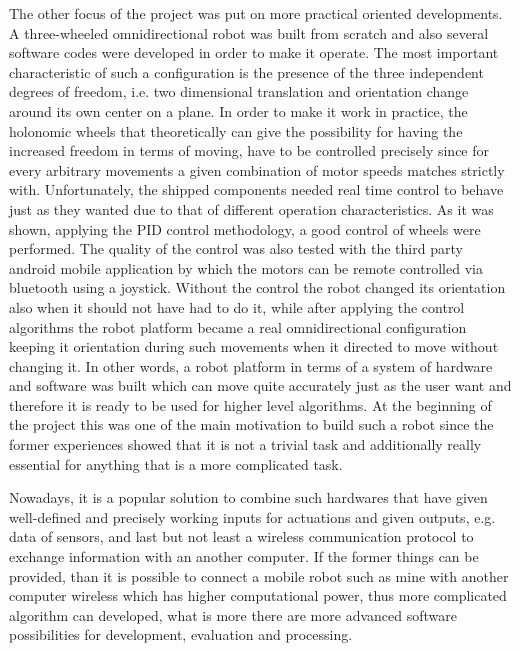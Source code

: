 \documentclass[12pt,english,twoside]{article}
\begin{document}
The other focus of the project was put on more practical oriented developments. A three-wheeled omnidirectional robot was built from scratch and also several software codes were developed in order to make it operate. The most important characteristic of such a configuration is the presence of the three independent degrees of freedom, i.e. two dimensional translation and orientation change around its own center on a plane. In order to make it work in practice, the holonomic wheels that theoretically can give the possibility for having the increased freedom in terms of moving, have to be controlled precisely since for every arbitrary movements a given combination of motor speeds matches strictly with. Unfortunately, the shipped components needed real time control to behave just as they wanted due to that of different operation characteristics. As it was shown, applying the PID control methodology, a good control of wheels were performed. The quality of the control was also tested with the third party android mobile application by which the motors can be remote controlled via bluetooth using a joystick. Without the control the robot changed its orientation also when it should not have had to do it, while after applying the control algorithms the robot platform became a real omnidirectional configuration keeping it orientation during such movements when it directed to move without changing it. In other words, a robot platform in terms of a system of hardware and software was built which can move quite accurately just as the user want and therefore it is ready to be used for higher level algorithms. At the beginning of the project this was one of the main motivation to build such a robot since the former experiences showed that it is not a trivial task and additionally really essential for anything that is a more complicated task.

Nowadays, it is a popular solution to combine such hardwares that have given well-defined and precisely working inputs for actuations and given outputs, e.g. data of sensors, and last but not least a wireless communication protocol to exchange information with an another computer. If the former things can be provided, than it is possible to connect a mobile robot such as mine with another computer wireless which has higher computational power, thus more complicated algorithm can developed, what is more there are more advanced software possibilities for development, evaluation and processing. 
\end{document}
